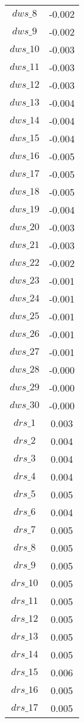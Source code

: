 \begin{center}
\begin{longtable}{cc}
$dws\_8$ 	 & 	 -0.002 \\
$dws\_9$ 	 & 	 -0.002 \\
$dws\_10$ 	 & 	 -0.003 \\
$dws\_11$ 	 & 	 -0.003 \\
$dws\_12$ 	 & 	 -0.003 \\
$dws\_13$ 	 & 	 -0.004 \\
$dws\_14$ 	 & 	 -0.004 \\
$dws\_15$ 	 & 	 -0.004 \\
$dws\_16$ 	 & 	 -0.005 \\
$dws\_17$ 	 & 	 -0.005 \\
$dws\_18$ 	 & 	 -0.005 \\
$dws\_19$ 	 & 	 -0.004 \\
$dws\_20$ 	 & 	 -0.003 \\
$dws\_21$ 	 & 	 -0.003 \\
$dws\_22$ 	 & 	 -0.002 \\
$dws\_23$ 	 & 	 -0.001 \\
$dws\_24$ 	 & 	 -0.001 \\
$dws\_25$ 	 & 	 -0.001 \\
$dws\_26$ 	 & 	 -0.001 \\
$dws\_27$ 	 & 	 -0.001 \\
$dws\_28$ 	 & 	 -0.000 \\
$dws\_29$ 	 & 	 -0.000 \\
$dws\_30$ 	 & 	 -0.000 \\
$drs\_1$ 	 & 	 0.003 \\
$drs\_2$ 	 & 	 0.004 \\
$drs\_3$ 	 & 	 0.004 \\
$drs\_4$ 	 & 	 0.004 \\
$drs\_5$ 	 & 	 0.005 \\
$drs\_6$ 	 & 	 0.004 \\
$drs\_7$ 	 & 	 0.005 \\
$drs\_8$ 	 & 	 0.005 \\
$drs\_9$ 	 & 	 0.005 \\
$drs\_10$ 	 & 	 0.005 \\
$drs\_11$ 	 & 	 0.005 \\
$drs\_12$ 	 & 	 0.005 \\
$drs\_13$ 	 & 	 0.005 \\
$drs\_14$ 	 & 	 0.005 \\
$drs\_15$ 	 & 	 0.006 \\
$drs\_16$ 	 & 	 0.005 \\
$drs\_17$ 	 & 	 0.005 \\

\end{longtable}
\end{center}
